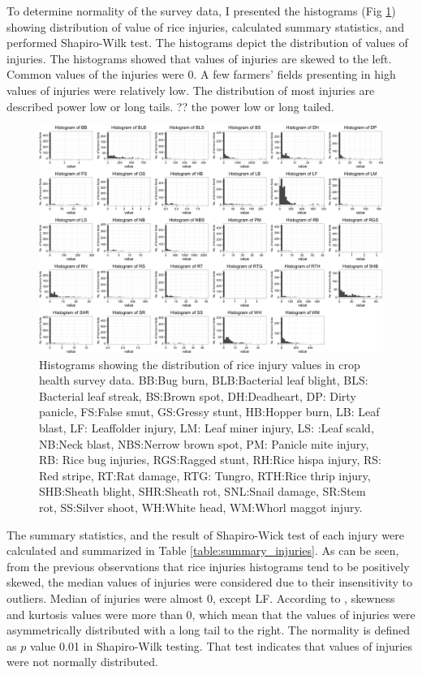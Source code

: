 To determine normality of the survey data, I presented the histograms (Fig \ref{fig:allhisto}) showing distribution of value of rice injuries, calculated summary statistics, and performed Shapiro-Wilk test. The histograms depict the distribution of values of injuries. The histograms showed that values of injuries are skewed to the left. Common values of the injuries were 0. A few farmers’ fields presenting in high values of injuries were relatively low. The distribution of most injuries are described power low or long tails. ?? the power low or long tailed.

\begin{landscape}
\begin{figure}[!h]
\centering
\includegraphics[width = 1\textwidth]{figures/allhisto2/allhisto2.png}
\caption{Histograms showing the distribution of rice injury values in crop health survey data. BB:Bug burn, BLB:Bacterial leaf blight, BLS: Bacterial leaf streak, BS:Brown spot, DH:Deadheart, DP: Dirty panicle, FS:False smut, GS:Gressy stunt, HB:Hopper burn, LB: Leaf blast, LF: Leaffolder injury, LM: Leaf miner injury, LS: :Leaf scald, NB:Neck blast, NBS:Nerrow brown spot, PM: Panicle mite injury, RB: Rice bug injuries, RGS:Ragged stunt, RH:Rice hispa injury, RS: Red stripe, RT:Rat damage, RTG: Tungro, RTH:Rice thrip injury, SHB:Sheath blight, SHR:Sheath rot, SNL:Snail damage, SR:Stem rot, SS:Silver shoot, WH:White head, WM:Whorl maggot injury.}
\label{fig:allhisto}
\end{figure}
\end{landscape}



The summary statistics, and the result of Shapiro-Wick test of each injury were calculated and summarized in Table \ref{table:summary_injuries}.  As can be seen, from the previous observations that rice injuries histograms tend to be positively skewed, the median values of injuries were considered due to their insensitivity to outliers. Median of injuries were almost 0, except LF. According to \citet{Doane_2011_Measuring}, skewness and kurtosis values were more than 0, which mean that the values of injuries were asymmetrically distributed with a long tail to the right. The normality is defined as $p$ value 0.01 in Shapiro-Wilk testing. That test indicates that values of injuries were not normally distributed.

